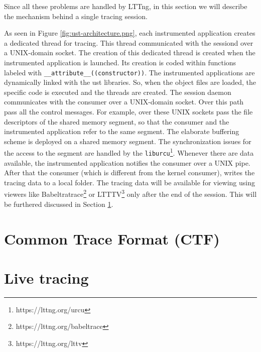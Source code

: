 Since all these problems are handled by LTTng, in this section we will describe
the mechanism behind a single tracing session.

As seen in Figure \ref{fig:ust-architecture.png}, each instrumented application
creates a dedicated thread for tracing. This thread communicated with the
sessiond over a UNIX-domain socket. The creation of this dedicated thread is
created when the instrumented application is launched. Its creation is coded
within functions labeled with \texttt{\_\_attribute\_\_((constructor))}. The
instrumented applications are dynamically linked with the ust libraries. So,
when the object files are loaded, the specific code is executed and the threads
are created. The session daemon communicates with the consumer over a
UNIX-domain socket. Over this path pass all the control messages. For example,
over these UNIX sockets pass the file descriptors of the shared memory segment,
so that the consumer and the instrumented application refer to the same segment.
The elaborate buffering scheme is deployed on a shared memory segment. The
synchronization issues for the access to the segment are handled by the
\texttt{liburcu}\footnote{https://lttng.org/urcu}. Whenever there are data
available, the instrumented application notifies the consumer over a UNIX pipe.
After that the consumer (which is different from the kernel consumer), writes
the tracing data to a local folder. The tracing data will be available for
viewing using viewers like Babeltratrace\footnote{https://lttng.org/babeltrace}
or LTTTV\footnote{https://lttng.org/lttv} only after the end of the session.
This will be furthered discussed in Section \ref{sec:ctf}.

 
\section{Common Trace Format (CTF)}\label{sec:ctf}

\section{Live tracing}\label{sec:relayd}
